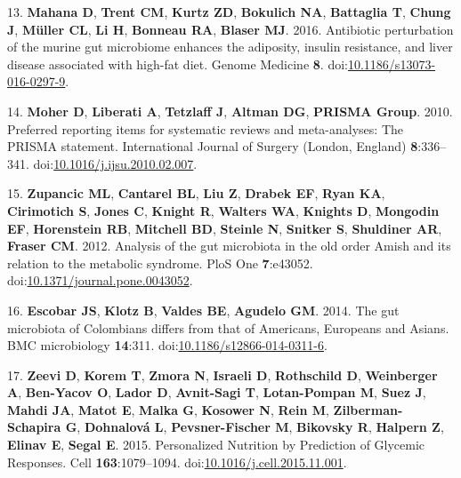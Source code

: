 \documentclass[12pt,]{article}
\begin{document}
\hypertarget{ref-Mahana2016}{}
13. \textbf{Mahana D}, \textbf{Trent CM}, \textbf{Kurtz ZD},
\textbf{Bokulich NA}, \textbf{Battaglia T}, \textbf{Chung J},
\textbf{Müller CL}, \textbf{Li H}, \textbf{Bonneau RA}, \textbf{Blaser
MJ}. 2016. Antibiotic perturbation of the murine gut microbiome enhances
the adiposity, insulin resistance, and liver disease associated with
high-fat diet. Genome Medicine \textbf{8}.
doi:\href{https://doi.org/10.1186/s13073-016-0297-9}{10.1186/s13073-016-0297-9}.

\hypertarget{ref-moherux5fpreferredux5f2010}{}
14. \textbf{Moher D}, \textbf{Liberati A}, \textbf{Tetzlaff J},
\textbf{Altman DG}, \textbf{PRISMA Group}. 2010. Preferred reporting
items for systematic reviews and meta-analyses: The PRISMA statement.
International Journal of Surgery (London, England) \textbf{8}:336--341.
doi:\href{https://doi.org/10.1016/j.ijsu.2010.02.007}{10.1016/j.ijsu.2010.02.007}.

\hypertarget{ref-zupancicux5fanalysisux5f2012}{}
15. \textbf{Zupancic ML}, \textbf{Cantarel BL}, \textbf{Liu Z},
\textbf{Drabek EF}, \textbf{Ryan KA}, \textbf{Cirimotich S},
\textbf{Jones C}, \textbf{Knight R}, \textbf{Walters WA},
\textbf{Knights D}, \textbf{Mongodin EF}, \textbf{Horenstein RB},
\textbf{Mitchell BD}, \textbf{Steinle N}, \textbf{Snitker S},
\textbf{Shuldiner AR}, \textbf{Fraser CM}. 2012. Analysis of the gut
microbiota in the old order Amish and its relation to the metabolic
syndrome. PloS One \textbf{7}:e43052.
doi:\href{https://doi.org/10.1371/journal.pone.0043052}{10.1371/journal.pone.0043052}.

\hypertarget{ref-escobarux5fgutux5f2014}{}
16. \textbf{Escobar JS}, \textbf{Klotz B}, \textbf{Valdes BE},
\textbf{Agudelo GM}. 2014. The gut microbiota of Colombians differs from
that of Americans, Europeans and Asians. BMC microbiology
\textbf{14}:311.
doi:\href{https://doi.org/10.1186/s12866-014-0311-6}{10.1186/s12866-014-0311-6}.

\hypertarget{ref-zeeviux5fpersonalizedux5f2015}{}
17. \textbf{Zeevi D}, \textbf{Korem T}, \textbf{Zmora N},
\textbf{Israeli D}, \textbf{Rothschild D}, \textbf{Weinberger A},
\textbf{Ben-Yacov O}, \textbf{Lador D}, \textbf{Avnit-Sagi T},
\textbf{Lotan-Pompan M}, \textbf{Suez J}, \textbf{Mahdi JA},
\textbf{Matot E}, \textbf{Malka G}, \textbf{Kosower N}, \textbf{Rein M},
\textbf{Zilberman-Schapira G}, \textbf{Dohnalová L},
\textbf{Pevsner-Fischer M}, \textbf{Bikovsky R}, \textbf{Halpern Z},
\textbf{Elinav E}, \textbf{Segal E}. 2015. Personalized Nutrition by
Prediction of Glycemic Responses. Cell \textbf{163}:1079--1094.
doi:\href{https://doi.org/10.1016/j.cell.2015.11.001}{10.1016/j.cell.2015.11.001}.
\end{document}
